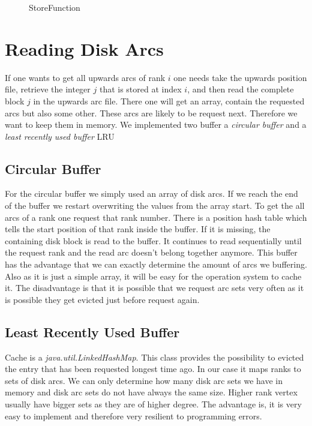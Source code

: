 \begin{figure}
    \centering
    
    \caption{StoreFunction}
    \label{fig:store_function}
\end{figure}

\section{Reading Disk Arcs}

If one wants to get all upwards arcs of rank $i$ one needs take  the upwards position file, retrieve the integer $j$ that is stored at index $i$, and then read the complete block $j$ in the upwards arc file. 
There one will get an array, contain the requested arcs but also some other. These arcs are likely to be request next. Therefore we want to keep them in memory. We implemented two buffer a \textit{circular buffer} and a \textit{least recently used buffer} LRU

\subsection{Circular Buffer}

For the circular buffer we simply used an array of disk arcs. If we reach the end of the buffer we restart overwriting the values from the array start. To get the all arcs of a rank one request that rank number. There is a position hash table which tells the start position of that rank inside the buffer. If it is missing, the containing disk block is read to the buffer. It 
continues to read sequentially until the request rank and the read arc doesn't belong together anymore. This buffer has the advantage that we can exactly determine the amount of arcs we buffering. Also as it is just a simple array, it will be easy for the operation system to cache it.
The disadvantage is that it is possible that we request arc sets very often as it is possible they get evicted just before request again.

\subsection{Least Recently Used Buffer}

Cache is a \textit{java.util.LinkedHashMap}. This class provides the possibility to evicted the entry that has been requested longest time ago. In our case it maps ranks to sets of disk arcs. We can only determine how many 
disk arc sets we have in memory and disk arc sets do not have always the same size. Higher rank vertex usually have bigger sets as they are of higher degree. The advantage is, it is very easy to implement and therefore very 
resilient to programming errors.

